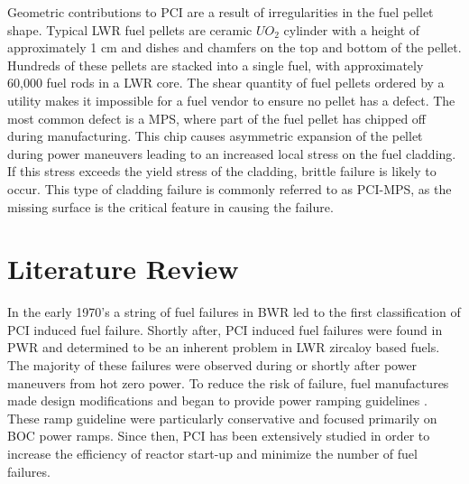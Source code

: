 \documentclass[edeposit,fullpage]{uiucthesis2009}
\begin{document}
Geometric contributions to \gls{PCI} are a result of irregularities in the fuel pellet shape.
Typical \gls{LWR} fuel pellets are ceramic $UO_2$ cylinder with a height of approximately 1 cm and dishes and chamfers on the top and bottom of the pellet.
Hundreds of these pellets are stacked into a single fuel, with approximately 60,000 fuel rods in a \gls{LWR} core.
The shear quantity of fuel pellets ordered by a utility makes it impossible for a fuel vendor to ensure no pellet has a defect.
The most common defect is a \gls{MPS}, where part of the fuel pellet has chipped off during manufacturing.
This chip causes asymmetric expansion of the pellet during power maneuvers leading to an increased local stress on the fuel cladding. 
If this stress exceeds the yield stress of the cladding, brittle failure is likely to occur.
This type of cladding failure is commonly referred to as \gls{PCI}-\gls{MPS}, as the missing surface is the critical feature in causing the failure.

\section{Literature Review}

In the early 1970's a string of fuel failures in \gls{BWR} led to the first classification of \gls{PCI} induced fuel failure.  
Shortly after, \gls{PCI} induced fuel failures were found in \gls{PWR} and determined to be an inherent problem in \gls{LWR} zircaloy based fuels. %
The majority of these failures were observed during or shortly after power maneuvers from hot zero power.
To reduce the risk of failure, fuel manufactures made design modifications and began to provide power ramping guidelines \cite{kennard_pci_2016}.
These ramp guideline were particularly conservative and focused primarily on \gls{BOC} power ramps. 
Since then, \gls{PCI} has been extensively studied in order to increase the efficiency of reactor start-up and minimize the number of fuel failures.
 
\end{document}
